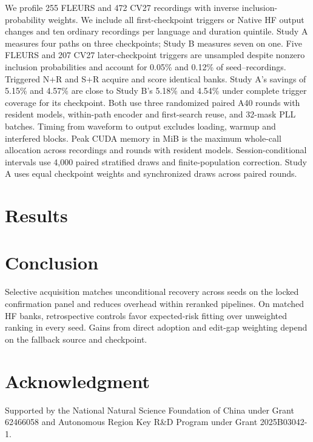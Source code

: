 \documentclass[conference,letterpaper]{IEEEtran}
\begin{document}
We profile 255 FLEURS and 472 CV27 recordings with inverse inclusion-probability weights. We include all first-checkpoint triggers or Native HF output changes and ten ordinary recordings per language and duration quintile. Study A measures four paths on three checkpoints; Study B measures seven on one. Five FLEURS and 207 CV27 later-checkpoint triggers are unsampled despite nonzero inclusion probabilities and account for 0.05\% and 0.12\% of seed--recordings. Triggered N+R and S+R acquire and score identical banks. Study A's savings of 5.15\% and 4.57\% are close to Study B's 5.18\% and 4.54\% under complete trigger coverage for its checkpoint. Both use three randomized paired A40 rounds with resident models, within-path encoder and first-search reuse, and 32-mask PLL batches. Timing from waveform to output excludes loading, warmup and interfered blocks. Peak CUDA memory in MiB is the maximum whole-call allocation across recordings and rounds with resident models. Session-conditional intervals use 4,000 paired stratified draws and finite-population correction. Study A uses equal checkpoint weights and synchronized draws across paired rounds.


\section{Results}

\section{Conclusion}
Selective acquisition matches unconditional recovery across seeds on the locked confirmation panel and reduces overhead within reranked pipelines. On matched HF banks, retrospective controls favor expected-risk fitting over unweighted ranking in every seed. Gains from direct adoption and edit-gap weighting depend on the fallback source and checkpoint.
\section*{Acknowledgment}
Supported by the National Natural Science Foundation of China under Grant 62466058 and Autonomous Region Key R\&D Program under Grant 2025B03042-1.
\label{iscas:body-end}\clearpage\raggedbottom\balance
\label{iscas:references-start}

\end{document}

